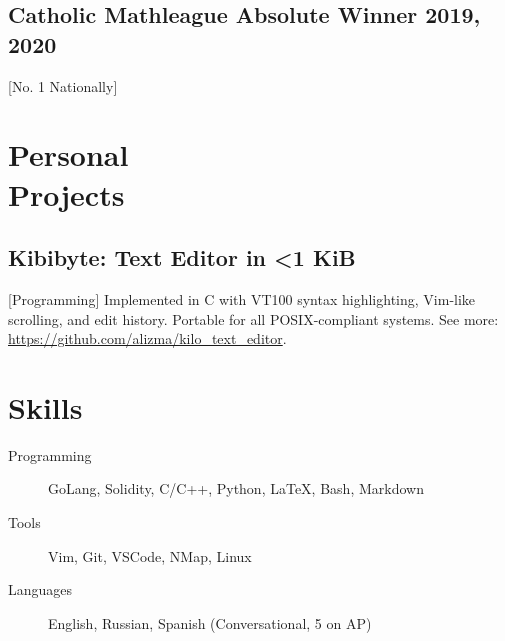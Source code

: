 \documentclass{mycv}
\begin{document}
\subsection{Catholic Mathleague Absolute Winner 2019, 2020}[No. 1 Nationally]

\section{Personal \\ Projects} 

\subsection{Kibibyte: Text Editor in <1 KiB}[Programming]
Implemented in C with VT100 syntax highlighting, Vim-like scrolling, and edit history. Portable for all POSIX-compliant systems. See more: \url{https://github.com/alizma/kilo_text_editor}.

\section{Skills}

\begin{description}
  \item[Programming] GoLang, Solidity, C/C++, Python, \LaTeX, Bash, Markdown
  \item[Tools] Vim, Git, VSCode, NMap, Linux
  \item[Languages] English, Russian, Spanish (Conversational, 5 on AP)
\end{description}
\end{document}
